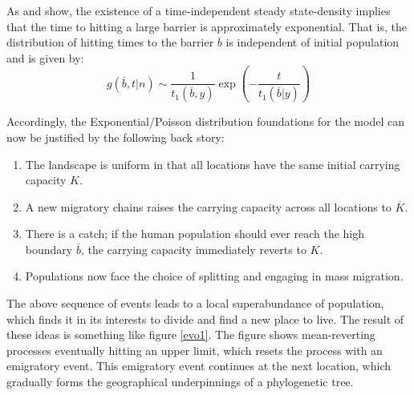 \documentclass[11pt]{article}
\begin{document}
As \cite{rdgn99} and \cite{nrs85} show, the existence of a time-independent steady state-density implies that the time to hitting a large barrier is approximately exponential. That is, the distribution of hitting times to the barrier $\overline{b}$ is independent of initial population and is given by:
\begin{equation*}
g(\overline{b},t|n) \sim \frac{1}{t_1(\overline{b},y)}\exp\left(-\frac{t}{t_1(\overline{b}|y)}\right) 
\end{equation*}

Accordingly, the Exponential/Poisson distribution foundations for the model can now be justified by the following back story:
\begin{enumerate}
\item The landscape is uniform in that all locations have the same initial carrying capacity $K$. 

\item A new migratory chains raises the carrying capacity across all locations to $\overline{K}$. 
\item There is a catch; if the human population should ever reach the high boundary $\overline{b}$, the carrying capacity immediately reverts to $K$.
\item Populations now face the choice of splitting and engaging in mass migration. 
\end{enumerate}

The above sequence of events leads to a local superabundance of population, which finds it in its interests to divide and find a new place to live.
The result of these ideas is something like figure \ref{evo1}. The figure shows mean-reverting processes eventually hitting an upper limit, which resets the process with an emigratory event. This emigratory event continues at the next location, which gradually forms the geographical underpinnings of a phylogenetic tree. 
\end{document}
